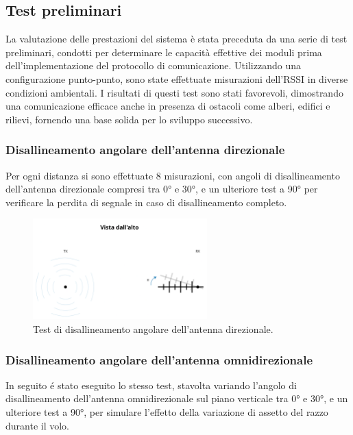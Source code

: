 \documentclass[12pt,a4paper,twoside]{book}
\begin{document}
\newpage
\subsection{Test preliminari}
La valutazione delle prestazioni del sistema è stata preceduta da una serie di test
preliminari, condotti per determinare le capacità effettive dei moduli prima
dell'implementazione del protocollo di comunicazione.
Utilizzando una configurazione punto-punto, sono state effettuate misurazioni dell'\ac{RSSI}
in diverse condizioni ambientali.
I risultati di questi test sono stati favorevoli, dimostrando una comunicazione
efficace anche in presenza di ostacoli come alberi, edifici e rilievi, fornendo
una base solida per lo sviluppo successivo.

\subsubsection{Disallineamento angolare dell'antenna direzionale}
Per ogni distanza si sono effettuate 8 misurazioni, con angoli di disallineamento
dell'antenna direzionale compresi tra 0° e 30°, e un ulteriore test a 90° per
verificare la perdita di segnale in caso di disallineamento completo.

\begin{figure}[H]
    \centering
    \includegraphics[width=0.6\textwidth]{img/tests/telemetry-test-direct.png}
    \caption{Test di disallineamento angolare dell'antenna direzionale.}
    \label{fig:directional-test}
\end{figure}
\newpage
\subsubsection{Disallineamento angolare dell'antenna omnidirezionale}
In seguito \'e stato eseguito lo stesso test, stavolta variando l'angolo di
disallineamento dell'antenna omnidirezionale sul piano verticale tra 0° e 30°,
e un ulteriore test a 90°, per simulare l'effetto della variazione di assetto
del razzo durante il volo.
\end{document}
